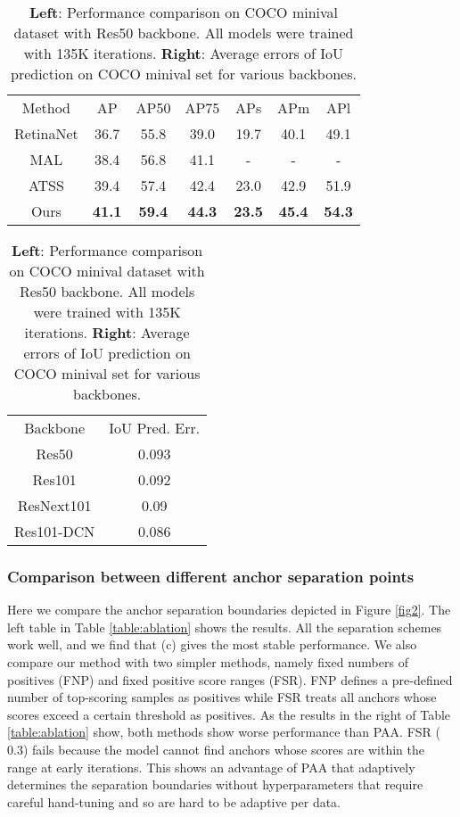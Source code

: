 \documentclass[runningheads]{llncs}
\begin{document}
\begin{table}[t]
\begin{center}
\caption {\textbf{Left}: Performance comparison on COCO minival dataset with Res50 backbone. All models were trained with 135K iterations. \textbf{Right}: Average errors of IoU prediction on COCO minival set for various backbones.}
\begin{minipage}{.6\linewidth}
\centering
\begin{tabular}{c|cccccc}
\hline\noalign{\smallskip}
Method & AP & AP50 & AP75 & APs & APm & APl \\
\noalign{\smallskip}
\hline
RetinaNet & 36.7 & 55.8 & 39.0 & 19.7 & 40.1 & 49.1\\
MAL\cite{mal} &  38.4 & 56.8 & 41.1 & - & - & -\\
ATSS\cite{atss} & 39.4 & 57.4 & 42.4 & 23.0 & 42.9 & 51.9\\
Ours & \textbf{41.1} & \textbf{59.4} & \textbf{44.3} & \textbf{23.5} & \textbf{45.4} & \textbf{54.3}\\
\hline
\end{tabular}
\label{table:val}
\end{minipage}\begin{minipage}{.4\linewidth}
\centering
\begin{tabular}{c|c}
\hline\noalign{\smallskip}
Backbone & IoU Pred. Err.\\
\noalign{\smallskip}
\hline
Res50 & 0.093\\
Res101 & 0.092\\
ResNext101 & 0.09\\
Res101-DCN & 0.086\\
\hline
\end{tabular}
\label{table:iou}
\end{minipage}\end{center}
\end{table}

\subsubsection{Comparison between different anchor separation points}
Here we compare the anchor separation boundaries depicted in Figure \ref{fig2}. The left table in Table \ref{table:ablation} shows the results. All the separation schemes work well, and we find that (c) gives the most stable performance. We also compare our method with two simpler methods, namely fixed numbers of positives (FNP) and fixed positive score ranges (FSR). FNP defines a pre-defined number of top-scoring samples as positives while FSR treats all anchors whose scores exceed a certain threshold as positives. As the results in the right of Table \ref{table:ablation} show, both methods show worse performance than PAA. FSR ( 0.3) fails because the model cannot find anchors whose scores are within the range at early iterations. This shows an advantage of PAA that adaptively determines the separation boundaries without hyperparameters that require careful hand-tuning and so are hard to be adaptive per data.
\end{document}
